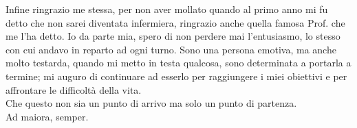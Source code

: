 Infine ringrazio me stessa, per non aver mollato quando al primo anno mi fu detto che non sarei diventata infermiera, 
ringrazio anche quella famosa Prof. che me l’ha detto. Io da parte mia, spero di non perdere mai l’entusiasmo, 
lo stesso con cui andavo in reparto ad ogni turno. Sono una persona emotiva, ma anche molto testarda, quando mi metto in 
testa qualcosa, sono determinata a portarla a termine; mi auguro di continuare ad esserlo per raggiungere i miei 
obiettivi e per affrontare le difficoltà della vita.\\ 
Che questo non sia un punto di arrivo ma solo un punto di partenza.\\ 
Ad maiora, semper. 


